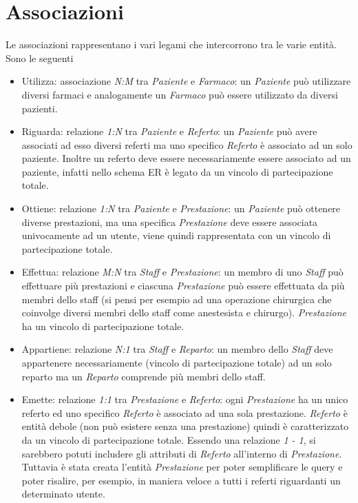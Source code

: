 \documentclass[paper=a4, fontsize=11pt,x11names]{report}
\begin{document}
\section{Associazioni}
Le associazioni rappresentano i vari legami che intercorrono tra le varie entità. Sono le seguenti
\begin{itemize}
\item Utilizza: associazione \textit{N:M} tra \textit{Paziente} e \textit{Farmaco}: un \textit{Paziente} può utilizzare diversi farmaci e analogamente un \textit{Farmaco} può essere utilizzato da diversi pazienti.
\item Riguarda: relazione \textit{1:N} tra \textit{Paziente} e \textit{Referto}: un \textit{Paziente} può avere associati ad esso diversi referti ma uno specifico \textit{Referto} è associato ad un solo paziente. Inoltre un referto deve essere necessariamente essere associato ad un paziente, infatti nello schema ER è legato da un vincolo di partecipazione totale.
\item Ottiene: relazione \textit{1:N} tra \textit{Paziente} e \textit{Prestazione}: un \textit{Paziente} può ottenere diverse prestazioni, ma una specifica \textit{Prestazione} deve essere associata univocamente ad un utente, viene quindi rappresentata con un vincolo di partecipazione totale.
\item Effettua: relazione \textit{M:N} tra \textit{Staff} e \textit{Prestazione}: un membro di uno \textit{Staff} può effettuare più prestazioni e ciascuna \textit{Prestazione} può essere effettuata da più membri dello staff (si pensi per esempio ad una operazione chirurgica che coinvolge diversi membri dello staff come anestesista e chirurgo). \textit{Prestazione} ha un vincolo di partecipazione totale.
\item Appartiene: relazione \textit{N:1} tra \textit{Staff} e \textit{Reparto}: un membro dello \textit{Staff} deve appartenere necessariamente (vincolo di partecipazione totale) ad un solo reparto ma un \textit{Reparto} comprende più membri dello staff.
\item Emette: relazione \textit{1:1} tra \textit{Prestazione} e \textit{Referto}: ogni \textit{Prestazione} ha un unico referto ed uno specifico \textit{Referto} è associato ad una sola prestazione. \textit{Referto} è entità debole (non può esistere senza una prestazione) quindi è caratterizzato da un vincolo di partecipazione totale. Essendo una relazione \textit{1 - 1}, si sarebbero potuti includere gli attributi di \textit{Referto} all'interno di \textit{Prestazione}. Tuttavia è stata creata l'entità \textit{Prestazione} per poter semplificare le query e poter risalire, per esempio, in maniera veloce a tutti i referti riguardanti un determinato utente.

\end{itemize}
\end{document}
